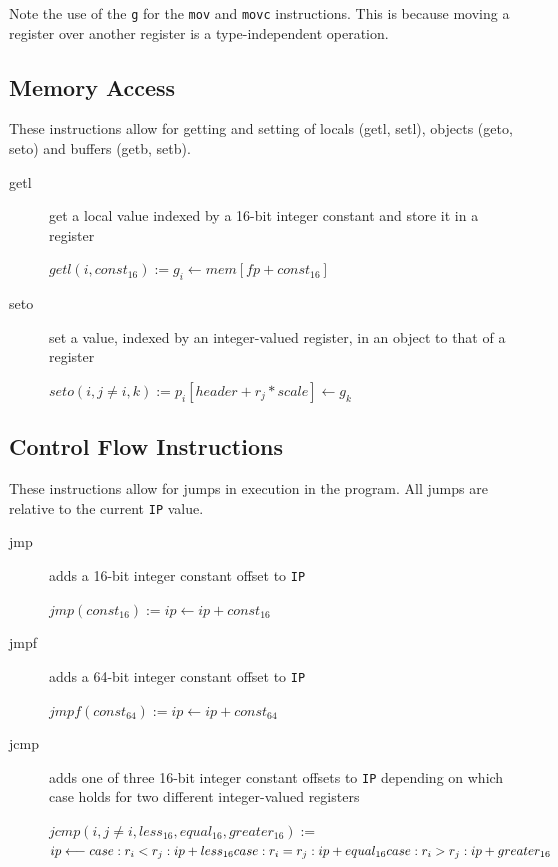 \documentclass[english,a4paper]{report}
\begin{document}
Note the use of the \verb|g| for the \verb|mov| and \verb|movc| instructions. This is because moving a register over another register is a type-independent operation. 

\subsection{Memory Access}
These instructions allow for getting and setting of locals (getl,
setl), objects (geto, seto) and buffers (getb, setb).

\begin{description}
	\item[getl] get a local value indexed by a 16-bit integer 
	constant and store it in a register
	
	$getl(i, const_{16}):= g_{i} \longleftarrow mem[fp + const_{16}]$ 
	\\
	\item[seto] set a value, indexed by an integer-valued register, 
	in an
	object to that of a register
	
	$seto(i, j \neq i, k):= p_{i}[header + r_{j}*scale] 
	\longleftarrow g_{k}$ \\
	
	
\end{description}


\subsection{Control Flow Instructions}

These instructions allow for jumps in execution in the program. All
jumps are relative to the current \verb|IP| value.

\begin{description}
	\item[jmp] adds a 16-bit integer constant offset to \verb|IP|
	
	$jmp(const_{16}) := ip \longleftarrow ip + const_{16}$ \\
	\item[jmpf] adds a 64-bit integer constant offset to \verb|IP|
	
	$jmpf(const_{64}) := ip \longleftarrow ip + const_{64}$ \\	
	
	\item[jcmp] adds one of three 16-bit integer constant offsets to
	\verb|IP| depending on which case holds for two different
	integer-valued registers
	
	$jcmp(i, j\neq i,less_{16},equal_{16},greater_{16}) :=$ \\
	$ ip \longleftarrow  \\
	case :r_{i} < r_{j}: ip + less_{16}   \\
	case :r_{i} = r_{j}: ip + equal_{16} \\
	case :r_{i} > r_{j}: ip + greater_{16}$ \\
\end{description}
\end{document}
